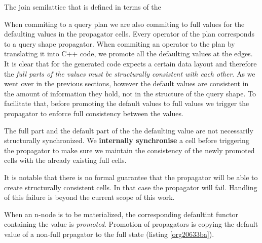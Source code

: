 \begin{listing}[p]
  \caption{\label{orgd554576}The join semilattice that is defined in terms of the}
\end{listing}

When commiting to a query plan we are also commiting to full values
for the defaulting values in the propagator cells. Every operator of
the plan corresponds to a query shape propagator. When commiting an
operator to the plan by translating it into C++ code, we promote all
the defaulting values at the edges. It is clear that for the generated
code expects a certain data layout and therefore the \emph{full parts of
  the values must be structurally consistent with each other}. As we
went over in the previous sections, however the default values are
consistent in the amount of information they hold, not in the
structure of the query shape. To facilitate that, before promoting the
default values to full values we trigger the propagator to enforce
full consistency between the values.

The full part and the default part of the the defaulting value are not
necessarily structurally synchronized. We \textbf{internally synchronise} a
cell before triggering the propagator to make sure we maintain the
consistency of the newly promoted cells with the already existing full
cells.

It is notable that there is no formal guarantee that the propagator
will be able to create structurally consistent cells. In that case the
propagator will fail. Handling of this failure is beyond the current
scope of this work.

When an n-node is to be materialized, the corresponding defaultint
functor containing the value is \emph{promoted}.  Promotion of propagators
is copying the default value of a non-full prpagator to the full
state (listing \ref{org20633ba}).


